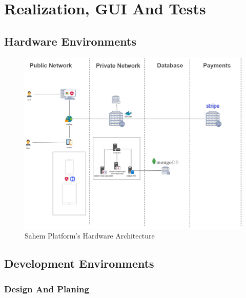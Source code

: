 

\setcounter{mtc}{11}

\chapter{Realization, GUI And Tests}%
\label{chap:chapter_four}
\minitoc

\section{Hardware Environments}

\begin{figure}[!ht]
      \centering
      \includegraphics[scale=0.30]{assets/architecturedrawio.jpg}
      \caption{Sahem Platform's Hardware Architecture}
      \label{fig:sahemarchitecturedrawio}
\end{figure}

\section{Development Environments}
\subsection{Design And Planing}

